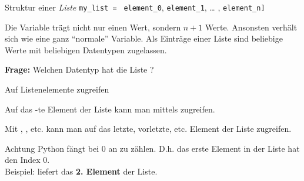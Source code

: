 \begin{fragile}

\begin{block}{Struktur einer \emph{Liste}}
\vspace{2pt}
\large
\texttt{my\_list = }\pause {\Large\texttt{[}}\pause 
\texttt{element\_0}\pause,
\pause 
\texttt{element\_1}, \pause 
 \dots   
, \texttt{element\_n}\pause \Large{\texttt{]}}
\end{block}

\pause 

Die Variable  trägt nicht nur einen Wert, sondern $n+1$ Werte. Ansonsten verhält sich  wie eine ganz \enquote{normale} Variable. 
Als Einträge einer Liste sind beliebige Werte mit beliebigen Datentypen zugelassen. 


\vspace{12pt}

\pause

\textbf{Frage:} Welchen Datentyp hat die Liste \py{[2, 2.3, "Hello"]} ? 
	
\end{fragile}

\begin{frame}
	
\begin{block}{Auf Listenelemente zugreifen}
	
\vspace{2pt}

Auf das -te Element der Liste  kann man mittels  zugreifen. 

\pause 

Mit , , etc. kann man auf das letzte, vorletzte, etc. Element 
der Liste zugreifen. 

\end{block}

\pause 
\vspace{12pt}

\begin{alertblock}{Achtung}
\vspace{2pt}
Python fängt bei 0 an zu zählen. D.h. das erste Element in der Liste hat den Index 0. \\
Beispiel:  liefert das \textbf{2. Element} der Liste. 
\end{alertblock}

	
\end{frame}	


